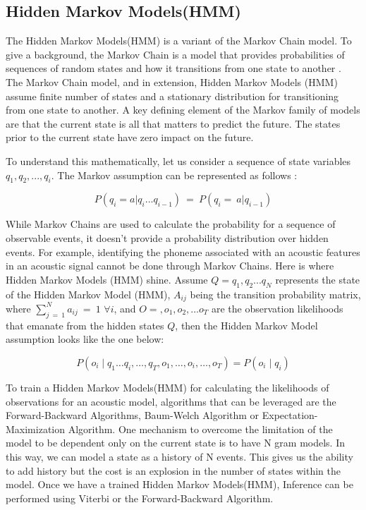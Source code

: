 \subsection{Hidden Markov Models(HMM)}%
\label{sec:hmm}

The Hidden Markov Models(HMM) is a variant of the Markov Chain model. To give a background, the Markov Chain is a model that provides probabilities of sequences of random states and how it transitions from one state to another \cite{gales2008application}. The Markov Chain model, and in extension, Hidden Markov Models (HMM) assume finite number of states and a stationary distribution for transitioning from one state to another. A key defining element of the Markov family of models are that the current state is all that matters to predict the future. The states prior to the current state have zero impact on the future.

To understand this mathematically, let us consider a sequence of state variables $q_1,q_2,...,q_i$. The Markov assumption can be represented as follows : 

\begin{equation}
P(q_i = a|q_i...q_{i-1})\ =\ P(q_i=\ a|q_{i-1})
\end{equation}

While Markov Chains are used to calculate the probability for a sequence of observable events, it doesn't provide a probability distribution over hidden events. For example, identifying the phoneme associated with an acoustic features in an acoustic signal cannot be done through Markov Chains. Here is where Hidden Markov Models (HMM) shine. Assume $Q = q_1, q_2 ... q_N$ represents the state of the Hidden Markov Model (HMM),  $A_{ij}$ being the transition probability matrix, where $\sum_{j\ =\ 1}^{N}{a_{ij}\ =\ 1}$   $\forall{i}$, and $O = ,o_1,o_2, ...o_T$ are the observation likelihoods that emanate from the hidden states $Q$, then the Hidden Markov Model assumption looks like the one below:

\begin{equation}
P\left(o_i \mid q_1 \ldots q_i, \ldots, q_T, o_1, \ldots, o_i, \ldots, o_T\right)=P\left(o_i \mid q_i\right)
\end{equation}

To train a Hidden Markov Models(HMM) for calculating the likelihoods of observations for an acoustic model, algorithms that can be leveraged are the Forward-Backward Algorithms, Baum-Welch Algorithm or Expectation-Maximization Algorithm. One mechanism to overcome the limitation of the model to be dependent only on the current state is to have N gram models. In this way, we can model a state as a history of N events. This gives us the ability to add history but the cost is an explosion in the number of states within the model. Once we have a trained Hidden Markov Models(HMM), Inference can be performed using Viterbi or the Forward-Backward Algorithm.

